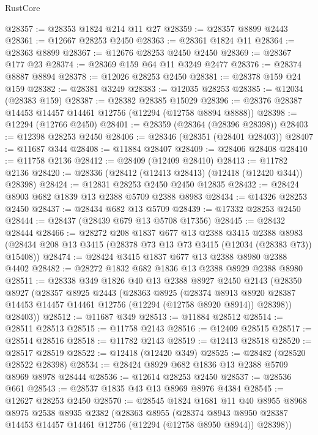 \begin{lexlean}{RustCore}
\begin{coremodule}
@28357 := @28353 @1824 @214 @11 @27
@28359 := @28357 @8899 @2443
@28361 := @12667 @28253 @2450
@28363 := @28361 @1824 @11
@28364 := @28363 @8899
@28367 := @12676 @28253 @2450 @2450
@28369 := @28367 @177 @23
@28374 := @28369 @159 @64 @11 @3249 @2477
@28376 := @28374 @8887 @8894
@28378 := @12026 @28253 @2450
@28381 := @28378 @159 @24 @159
@28382 := @28381 @3249
@28383 := @12035 @28253
@28385 := @12034 (@28383 @159)
@28387 := @28382 @28385 @15029
@28396 := @28376 @28387 @14453 @14457 @14461 @12756 (@12294 (@12758 @8894 @8888))
@28398 := @12294 (@12766 @2450)
@28401 := @28359 (@28364 (@28396 @28398))
@28403 := @12398 @28253 @2450
@28406 := @28346 (@28351 (@28401 @28403))
@28407 := @11687 @344
@28408 := @11884 @28407
@28409 := @28406 @28408
@28410 := @11758 @2136
@28412 := @28409 (@12409 @28410)
@28413 := @11782 @2136
@28420 := @28336 (@28412 (@12413 @28413) (@12418 (@12420 @344)) @28398)
@28424 := @12831 @28253 @2450 @2450 @12835
@28432 := @28424 @8903 @682 @1839 @13 @2388 @5709 @2388 @8983
@28434 := @14326 @28253 @2450
@28437 := @28434 @682 @13 @5709
@28439 := @17332 @28253 @2450
@28444 := @28437 (@28439 @679 @13 @5708 @17356)
@28445 := @28432 @28444
@28466 := @28272
    @208
    @1837
    @677
    @13
    @2388
    @3415
    @2388
    @8983
    (@28434 @208 @13 @3415 (@28378 @73 @13 @73 @3415 (@12034 (@28383 @73)) @15408))
@28474 := @28424 @3415 @1837 @677 @13 @2388 @8980 @2388 @4402
@28482 := @28272 @1832 @682 @1836 @13 @2388 @8929 @2388 @8980
@28511 := @28338
    @349
    @1826
    @40
    @13
    @2388
    @8927
    @2450
    @2143
    (@28350
      @8927
      (@28357
        @8925
        @2443
        (@28363
          @8925
          (@28374
            @8913
            @8920
            @28387
            @14453
            @14457
            @14461
            @12756
            (@12294 (@12758 @8920 @8914))
            @28398))
        @28403))
@28512 := @11687 @349
@28513 := @11884 @28512
@28514 := @28511 @28513
@28515 := @11758 @2143
@28516 := @12409 @28515
@28517 := @28514 @28516
@28518 := @11782 @2143
@28519 := @12413 @28518
@28520 := @28517 @28519
@28522 := @12418 (@12420 @349)
@28525 := @28482 (@28520 @28522 @28398)
@28534 := @28424 @8929 @682 @1836 @13 @2388 @5709 @8969 @8978 @28444
@28536 := @12614 @28253 @2450
@28537 := @28536 @661
@28543 := @28537 @1835 @43 @13 @8969 @8976 @4384
@28545 := @12627 @28253 @2450
@28570 := @28545
    @1824
    @1681
    @11
    @40
    @8955
    @8968
    @8975
    @2538
    @8935
    @2382
    (@28363
      @8955
      (@28374 @8943 @8950 @28387 @14453 @14457 @14461 @12756 (@12294 (@12758 @8950 @8944)) @28398))

\end{coremodule}
\end{lexlean}
